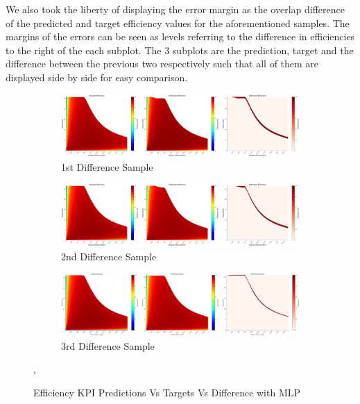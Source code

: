 \documentclass{report} %
\begin{document}
We also took the liberty of displaying the error margin as the overlap difference of the predicted and target efficiency values for the aforementioned samples. 
The margins of the errors can be seen as levels referring to the difference in efficiencies to the right of the each subplot. The 3 subplots are the prediction, target 
and the difference between the previous two respectively such that all of them are displayed side by side for easy comparison. 

\begin{figure}[H]
    \centering
    \begin{subfigure}{1\textwidth}
        \centering
        \includegraphics[width=1\textwidth]{./ReportImages/evalkpi3dprediction1.png} 
        \caption{1st Difference Sample} 
        \label{fig:1st Difference Sample}
    \end{subfigure}\hfill
    \begin{subfigure}{1\textwidth}
        \centering
        \includegraphics[width=1\textwidth]{./ReportImages/evalkpi3dprediction2.png} 
        \caption{2nd Difference Sample} 
        \label{fig:2nd Difference Sample}
    \end{subfigure}\hfill
    \begin{subfigure}{1\textwidth}
        \centering
        \includegraphics[width=1\textwidth]{./ReportImages/evalkpi3dprediction3.png} 
        \caption{3rd Difference Sample} 
        \label{fig:3rd Difference Sample}
    \end{subfigure}
    \caption{Efficiency \ac{KPI} Predictions Vs Targets Vs Difference with \ac{MLP}},
    \label{fig:Efficiency KPI Predictions Vs Targets Vs Difference with MLP}
\end{figure} 
\end{document}
